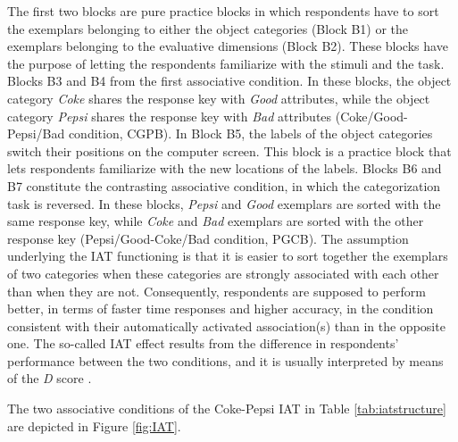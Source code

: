 \documentclass[12pt]{book}
\begin{document}
The first two blocks are pure practice blocks in which respondents have to sort the exemplars belonging to either the  object categories (Block B1) or the exemplars belonging to the evaluative dimensions (Block B2). These blocks have the purpose of letting the respondents familiarize with the stimuli and the task. Blocks B3 and B4 from the first associative condition. In these blocks, the object category \emph{Coke} shares the response key with \emph{Good} attributes, while the object category \emph{Pepsi} shares the response key with \emph{Bad} attributes (Coke/Good-Pepsi/Bad condition, CGPB). 
In Block B5, the labels of the object categories switch their positions on the computer screen. This block is a practice block  that lets respondents familiarize with the new locations of the labels. 
Blocks B6 and B7 constitute the contrasting associative condition, in which the categorization task is reversed. In these blocks, \emph{Pepsi} and \emph{Good} exemplars are sorted with the same response key, while \emph{Coke} and \emph{Bad} exemplars are sorted with the other response key (Pepsi/Good-Coke/Bad condition, PGCB). 
The assumption underlying the IAT functioning is that it is easier to sort together the exemplars of two categories when these categories are strongly associated with each other than when they are not. Consequently, respondents are supposed to perform better, in terms of faster time responses and higher accuracy, in the condition consistent with their automatically activated association(s) than in the opposite one.
The so-called IAT effect results from the difference in respondents' performance between the two conditions, and it is usually interpreted by means of the \emph{D} score \cite[see Section \ref{sec:iatD}]{Greenwald2003}.

The two associative conditions of the Coke-Pepsi IAT in Table \ref{tab:iatstructure} are depicted in Figure \ref{fig:IAT}. 
\end{document}
